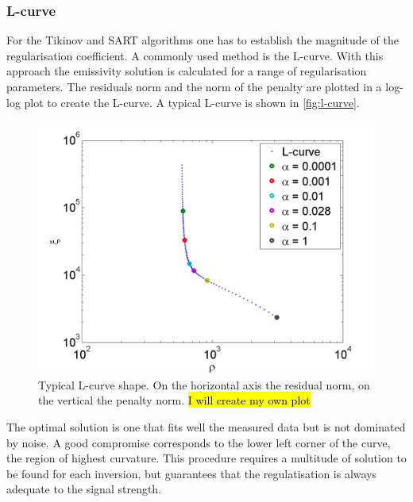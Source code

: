 \subsubsection{L-curve}
For the Tikinov and SART algorithms one has to establish the magnitude of the regularisation coefficient. A commonly used method is the L-curve. With this approach the emissivity solution is calculated for a range of regularisation parameters. The residuals norm and the norm of the penalty are plotted in a log-log plot to create the L-curve. A typical L-curve is shown in \autoref{fig:l-curve}.

\begin{figure}
	\centering
	\includegraphics[width=\linewidth]{Chapters/chapter2/figs/l-curve.png}
	\caption{Typical L-curve shape. On the horizontal axis the residual norm, on the vertical the penalty norm. \hl{I will create my own plot}}
	\label{fig:l-curve}
\end{figure}

The optimal solution is one that fits well the measured data but is not dominated by noise. A good compromise corresponds to the lower left corner of the curve, the region of highest curvature. This procedure requires a multitude of solution to be found for each inversion, but guarantees that the regulatisation is always adequate to the signal strength.

